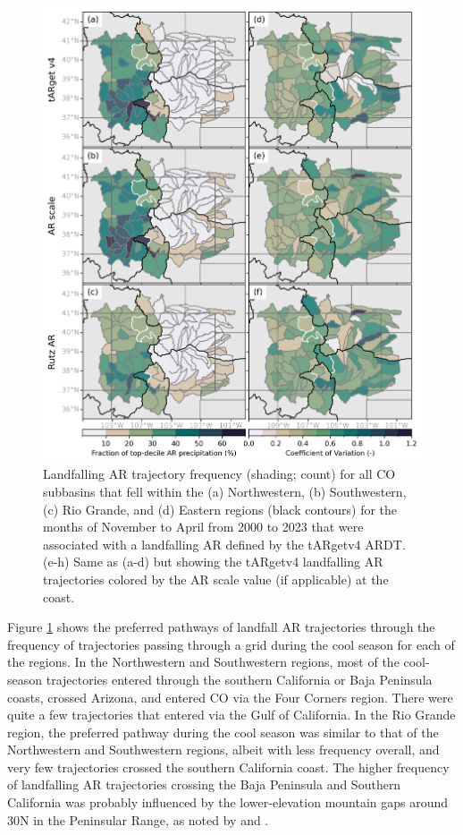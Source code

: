 \documentclass[draft]{agujournal2019}
\begin{document}
\begin{figure}
\noindent\includegraphics[width=\textwidth, height=\textheight, keepaspectratio]{fig3.png}
\caption{Landfalling AR trajectory frequency (shading; count) for all CO subbasins that fell within the (a) Northwestern, (b) Southwestern, (c) Rio Grande, and (d) Eastern regions (black contours) for the months of November to April from 2000 to 2023 that were associated with a landfalling AR defined by the tARgetv4 ARDT. (e-h) Same as (a-d) but showing the tARgetv4 landfalling AR trajectories colored by the AR scale value (if applicable) at the coast.}
\label{fig:heatmap-spaghetti_NDJFMA}
\end{figure}

Figure \ref{fig:heatmap-spaghetti_NDJFMA} shows the preferred pathways of landfall AR trajectories through the frequency of trajectories passing through a grid during the cool season for each of the regions. In the Northwestern and Southwestern regions, most of the cool-season trajectories entered through the southern California or Baja Peninsula coasts, crossed Arizona, and entered CO via the Four Corners region. There were quite a few trajectories that entered via the Gulf of California. In the Rio Grande region, the preferred pathway during the cool season was similar to that of the Northwestern and Southwestern regions, albeit with less frequency overall, and very few trajectories crossed the southern California coast. The higher frequency of landfalling AR trajectories crossing the Baja Peninsula and Southern California was probably influenced by the lower-elevation mountain gaps around 30\textdegree N in the Peninsular Range, as noted by  and . 
\end{document}
